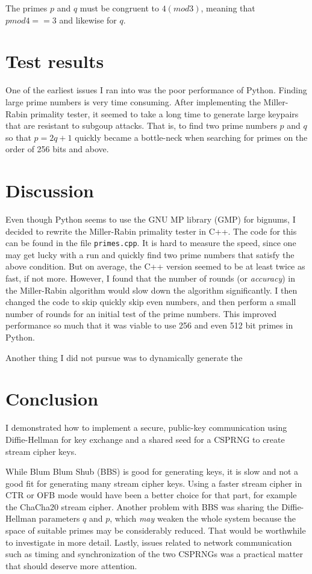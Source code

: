 \documentclass[a4paper,english,12pt]{article}
\begin{document}
The primes $p$ and $q$ must be congruent to $4 (mod 3)$, meaning that $p mod 4
== 3$ and likewise for $q$.

\section{Test results}
One of the earliest issues I ran into was the poor performance of Python.
Finding large prime numbers is very time consuming. After implementing the
Miller-Rabin primality tester, it seemed to take a long time to generate large
keypairs that are resistant to subgoup attacks. That is, to find two prime
numbers $p$ and $q$ so that $p = 2q+1$ quickly became a bottle-neck when
searching for primes on the order of 256 bits and above.

\section{Discussion}
Even though Python seems to use the GNU MP library (GMP) for bignums, I decided
to rewrite the Miller-Rabin primality tester in C++. The code for this can be
found in the file \texttt{primes.cpp}. It is hard to measure the speed, since
one may get lucky with a run and quickly find two prime numbers that satisfy
the above condition. But on average, the C++ version seemed to be at least
twice as fast, if not more. However, I found that the number of rounds (or
\textit{accuracy}) in the Miller-Rabin algorithm would slow down the algorithm
significantly. I then changed the code to skip quickly skip even numbers, and
then perform a small number of rounds for an initial test of the prime numbers.
This improved performance so much that it was viable to use 256 and even 512
bit primes in Python.

Another thing I did not pursue was to dynamically generate the

\section{Conclusion}
I demonstrated how to implement a secure, public-key communication using
Diffie-Hellman for key exchange and a shared seed for a CSPRNG to create stream
cipher keys.

While Blum Blum Shub (BBS) is good for generating keys, it is slow and not a good fit
for generating many stream cipher keys. Using a faster stream cipher in CTR or
OFB mode would have been a better choice for that part, for example the
ChaCha20 \cite{chacha20} stream cipher. Another problem with BBS was sharing
the Diffie-Hellman parameters $q$ and $p$, which \textit{may} weaken the whole
system because the space of suitable primes may be considerably reduced. That
would be worthwhile to investigate in more detail. Lastly, issues related to
network communication such as timing and synchronization of the two CSPRNGs was
a practical matter that should deserve more attention.



\end{document}
